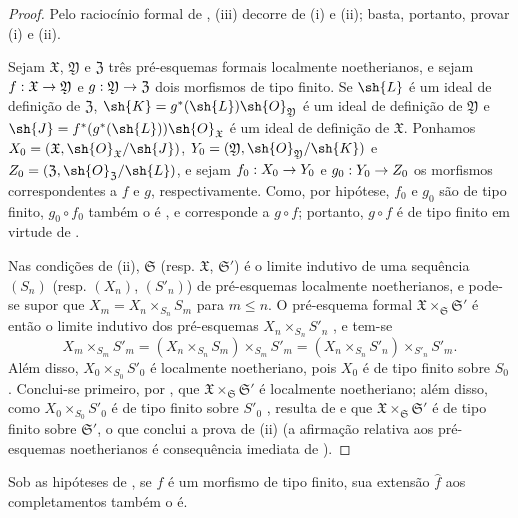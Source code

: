 \documentclass[oneside]{amsart}
\makeatletter
\renewcommand{\leq}{\leqslant}
\newcommand{\ega@arrow}[2]{\mathchoice{#1}{#2}{#2}{#2}}
\renewcommand{\to}{\ega@arrow{\longrightarrow}{\rightarrow}}
\let\EGAOriginalLabel\label
\renewcommand{\label}[1]{\phantomsection\EGAOriginalLabel{#1}}
\makeatother
\begin{document}
\begin{proof}
Pelo raciocínio formal de , (iii) decorre de (i) e (ii); basta, portanto, provar (i) e (ii).

Sejam $\mathfrak{X}$, $\mathfrak{Y}$ e $\mathfrak{Z}$ três pré-esquemas formais localmente noetherianos, e sejam $f:\mathfrak{X}\to\mathfrak{Y}$ e $g:\mathfrak{Y}\to\mathfrak{Z}$ dois morfismos de tipo finito.
Se $\sh{L}$ é um ideal de definição de $\mathfrak{Z}$, $\sh{K}=g^*(\sh{L})\sh{O}_\mathfrak{Y}$ é um ideal de definição de $\mathfrak{Y}$ e $\sh{J}=f^*(g^*(\sh{L}))\sh{O}_\mathfrak{X}$ é um ideal de definição de $\mathfrak{X}$.
Ponhamos $X_0=(\mathfrak{X},\sh{O}_\mathfrak{X}/\sh{J})$, $Y_0=(\mathfrak{Y},\sh{O}_\mathfrak{Y}/\sh{K})$ e $Z_0=(\mathfrak{Z},\sh{O}_\mathfrak{Z}/\sh{L})$, e sejam $f_0:X_0\to Y_0$ e $g_0:Y_0\to Z_0$ os morfismos correspondentes a $f$ e $g$, respectivamente.
Como, por hipótese, $f_0$ e $g_0$ são de tipo finito, $g_0\circ f_0$ também o é , e corresponde a $g\circ f$;
portanto, $g\circ f$ é de tipo finito em virtude de .

Nas condições de (ii), $\mathfrak{S}$ (resp. $\mathfrak{X}$, $\mathfrak{S}'$) é o limite indutivo de uma sequência $(S_n)$ (resp. $(X_n)$, $(S'_n)$) de pré-esquemas localmente noetherianos, e pode-se supor  que $X_m=X_n\times_{S_n}S_m$ para $m\leq n$.
O pré-esquema formal $\mathfrak{X}\times_\mathfrak{S}\mathfrak{S}'$ é então o limite indutivo dos pré-esquemas $X_n\times_{S_n}S'_n$ , e tem-se
\[
    X_m\times_{S_m}S'_m = (X_n\times_{S_n}S_m)\times_{S_m}S'_m = (X_n\times_{S_n}S'_n)\times_{S'_n}S'_m.
\]
Além disso, $X_0\times_{S_0}S'_0$ é localmente noetheriano, pois $X_0$ é de tipo finito sobre $S_0$ .
Conclui-se primeiro, por , que $\mathfrak{X}\times_\mathfrak{S}\mathfrak{S}'$ é localmente noetheriano;
além disso, como $X_0\times_{S_0}S'_0$ é de tipo finito sobre $S'_0$ , resulta de  e  que $\mathfrak{X}\times_\mathfrak{S}\mathfrak{S}'$ é de tipo finito sobre $\mathfrak{S}'$, o que conclui a prova de (ii) (a afirmação relativa aos pré-esquemas noetherianos é consequência imediata de ).
\end{proof}

\begin{corollary}[10.13.6]
\label{I.10.13.6}
Sob as hipóteses de , se $f$ é um morfismo de tipo finito, sua extensão $\widehat{f}$ aos completamentos também o é.
\end{corollary}
\end{document}
